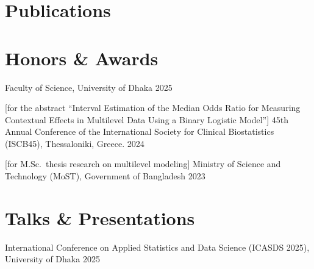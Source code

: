 \documentclass[letterpaper,11pt]{article}
\begin{document}

\ifcv
\section*{Publications}


\nocite{*}
\printbibliography[heading=none, prenote=symbols]
\fi



\section*{Honors \& Awards}

\begin{itemize}
            {Faculty of Science, University of Dhaka}
            {2025}

            [for the abstract ``Interval Estimation of the Median Odds
            Ratio for Measuring Contextual Effects in Multilevel Data Using a
            Binary Logistic Model'']
            {45th Annual Conference of the International Society for Clinical
            Biostatistics (ISCB45), Thessaloniki, Greece.}
            {2024}

            [for M.Sc.\ thesis research on multilevel modeling]
            {Ministry of Science and Technology (MoST), Government of Bangladesh}
            {2023}
\end{itemize}



\ifcv
\section*{Talks \& Presentations}

\begin{itemize}
         {International Conference on Applied Statistics and Data Science
          (ICASDS 2025), University of Dhaka}
         {2025}
\end{itemize}
\fi
\end{document}
